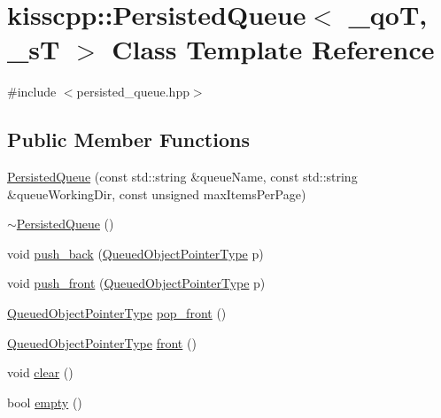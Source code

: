 \hypertarget{classkisscpp_1_1_persisted_queue}{\section{kisscpp\-:\-:Persisted\-Queue$<$ \-\_\-qo\-T, \-\_\-s\-T $>$ Class Template Reference}
\label{classkisscpp_1_1_persisted_queue}
}


{\ttfamily \#include $<$persisted\-\_\-queue.\-hpp$>$}

\subsection*{Public Member Functions}
\begin{DoxyCompactItemize}
\item 
\hyperlink{classkisscpp_1_1_persisted_queue_a2cd18dcb5bcb354e9cc84897f71077f7}{Persisted\-Queue} (const std\-::string \&queue\-Name, const std\-::string \&queue\-Working\-Dir, const unsigned max\-Items\-Per\-Page)
\item 
\hyperlink{classkisscpp_1_1_persisted_queue_aa7b51ad9ce0381d197eea1c5aabcac12}{$\sim$\-Persisted\-Queue} ()
\item 
void \hyperlink{classkisscpp_1_1_persisted_queue_aad570ffebafdabe33d565563aa037d9c}{push\-\_\-back} (\hyperlink{persisted__queue_8hpp_afaed39dc5f50bc993872e2d46490667c}{Queued\-Object\-Pointer\-Type} p)
\item 
void \hyperlink{classkisscpp_1_1_persisted_queue_a7c621270f05ecb9bcffb3112e5f46ec4}{push\-\_\-front} (\hyperlink{persisted__queue_8hpp_afaed39dc5f50bc993872e2d46490667c}{Queued\-Object\-Pointer\-Type} p)
\item 
\hyperlink{persisted__queue_8hpp_afaed39dc5f50bc993872e2d46490667c}{Queued\-Object\-Pointer\-Type} \hyperlink{classkisscpp_1_1_persisted_queue_a59281db3a6b7e50c6291d6c707152aea}{pop\-\_\-front} ()
\item 
\hyperlink{persisted__queue_8hpp_afaed39dc5f50bc993872e2d46490667c}{Queued\-Object\-Pointer\-Type} \hyperlink{classkisscpp_1_1_persisted_queue_a845cd8c74c5c8996b57bc0663f540940}{front} ()
\item 
void \hyperlink{classkisscpp_1_1_persisted_queue_a1ad220b2617f732878013e8df8cfadce}{clear} ()
\item 
bool \hyperlink{classkisscpp_1_1_persisted_queue_a59ce4b260c250368e50ed77becb02415}{empty} ()
\end{DoxyCompactItemize}


